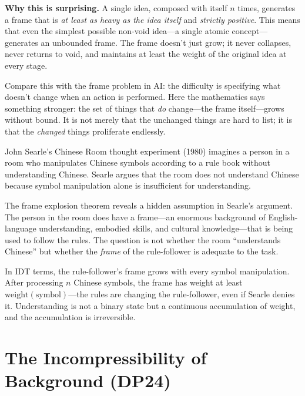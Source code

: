 \begin{surprisebox}
\noindent\textbf{Why this is surprising.}
A single idea, composed with itself $n$ times, generates a frame that is
\emph{at least as heavy as the idea itself} and \emph{strictly positive}.
This means that even the simplest possible non-void idea---a single
atomic concept---generates an unbounded frame.  The frame doesn't just
grow; it never collapses, never returns to void, and maintains at least
the weight of the original idea at every stage.

Compare this with the frame problem in AI: the difficulty is specifying
what doesn't change when an action is performed.  Here the mathematics
says something stronger: the set of things that \emph{do} change---the
frame itself---grows without bound.  It is not merely that the
unchanged things are hard to list; it is that the \emph{changed} things
proliferate endlessly.
\end{surprisebox}

\begin{interpretation}
\label{interp:chinese-room}
John Searle's Chinese Room thought experiment (1980) imagines a person
in a room who manipulates Chinese symbols according to a rule book
without understanding Chinese.  Searle argues that the room does not
understand Chinese because symbol manipulation alone is insufficient
for understanding.

The frame explosion theorem reveals a hidden assumption in Searle's
argument.  The person in the room does have a frame---an enormous
background of English-language understanding, embodied skills, and
cultural knowledge---that is being used to follow the rules.  The
question is not whether the room ``understands Chinese'' but whether
the \emph{frame} of the rule-follower is adequate to the task.

In IDT terms, the rule-follower's frame grows with every symbol
manipulation.  After processing $n$ Chinese symbols, the frame has
weight at least $\mathrm{weight}(\text{symbol})$---the rules are
changing the rule-follower, even if Searle denies it.  Understanding
is not a binary state but a continuous accumulation of weight, and the
accumulation is irreversible.
\end{interpretation}

\section{The Incompressibility of Background (DP24)}

